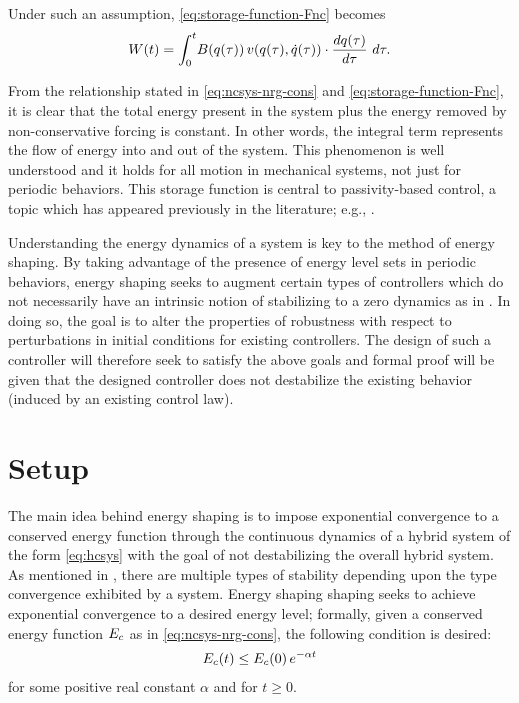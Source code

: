%
Under such an assumption, \eqref{eq:storage-function-Fnc} becomes
\begin{align}
  \label{eq:storage-function}
  W(t) = \int_{0}^{t} \! B(q(\tau)) \, v(q(\tau), \dot{q}(\tau)) \cdot
  \frac{dq(\tau)}{d\tau} \ d\tau.
\end{align}

From the relationship stated in \eqref{eq:ncsys-nrg-cons} and
\eqref{eq:storage-function-Fnc}, it is clear that the total energy present in
the system plus the energy removed by non-conservative forcing is constant.
%
In other words, the integral term represents the flow of energy into and out of
the system.
%
This phenomenon is well understood and it holds for all motion in mechanical
systems, not just for periodic behaviors.
%
This storage function is central to passivity-based control, a topic which
has appeared previously in the literature; e.g., \cite{Spong2007}.

Understanding the energy dynamics of a system is key to the method of energy
shaping.
%
By taking advantage of the presence of energy level sets in periodic behaviors,
energy shaping seeks to augment certain types of controllers which do not
necessarily have an intrinsic notion of stabilizing to a zero dynamics as in
\cite{Ames2014}.
%
In doing so, the goal is to alter the properties of robustness with respect to
perturbations in initial conditions for existing controllers.
%
The design of such a controller will therefore seek to satisfy the above goals
and formal proof will be given that the designed controller does not destabilize
the existing behavior (induced by an existing control law).

\section{Setup}

The main idea behind energy shaping is to impose exponential convergence to a
conserved energy function through the continuous dynamics of a hybrid system of
the form \eqref{eq:hcsys} with the goal of not destabilizing the overall hybrid
system.
%
As mentioned in , there are multiple types of stability
depending upon the type convergence exhibited by a system.
%
Energy shaping shaping seeks to achieve exponential convergence to a desired
energy level;
%
formally, given a conserved energy function $E_{c}$ as in
\eqref{eq:ncsys-nrg-cons}, the following condition is desired:
\begin{align*}
  E_{c}(t) \leq E_{c}(0) \, e^{-\alpha t}
\end{align*}
for some positive real constant $\alpha$ and for $t \geq 0$.

